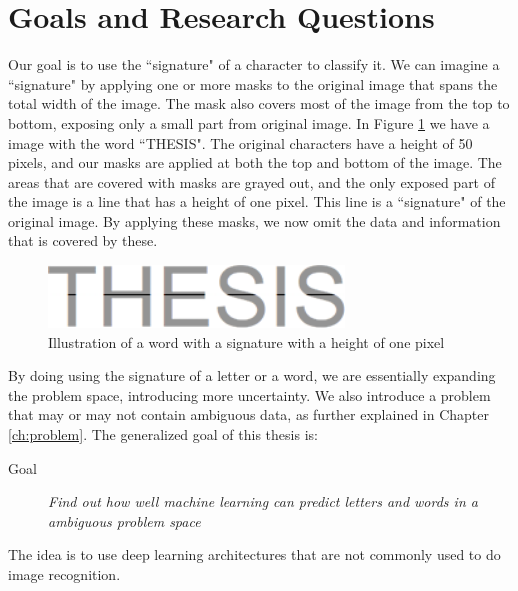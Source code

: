 
\section{Goals and Research Questions}
\label{sec:goals_and_research_questions}
Our goal is to use the ``signature" of a character to classify it. We can imagine a ``signature" by applying one or more masks to the original image that spans the total width of the image. The mask also covers most of the image from the top to bottom, exposing only a small part from original image. In Figure \ref{fig:thesis-signature} we have a image with the word ``THESIS". The original characters have a height of 50 pixels, and our masks are applied at both the top and bottom of the image. The areas that are covered with masks are grayed out, and the only exposed part of the image is a line that has a height of one pixel. This line is a ``signature" of the original image. By applying these masks, we now omit the data and information that is covered by these.

\begin{figure}[ht]
    \centering
    \includegraphics[width=0.7\textwidth]{fig/chapter1/signature.png}
    \caption{Illustration of a word with a signature with a height of one pixel}
    \label{fig:thesis-signature}
\end{figure}

By doing using the signature of a letter or a word, we are essentially expanding the problem space, introducing more uncertainty. We also introduce a problem that may or may not contain ambiguous data, as further explained in Chapter \ref{ch:problem}. The generalized goal of this thesis is:

\begin{description}
\item[Goal] {\textit{Find out how well machine learning can predict letters and words in a ambiguous problem space}}
\end{description}

The idea is to use deep learning architectures that are not commonly used to do image recognition. 



